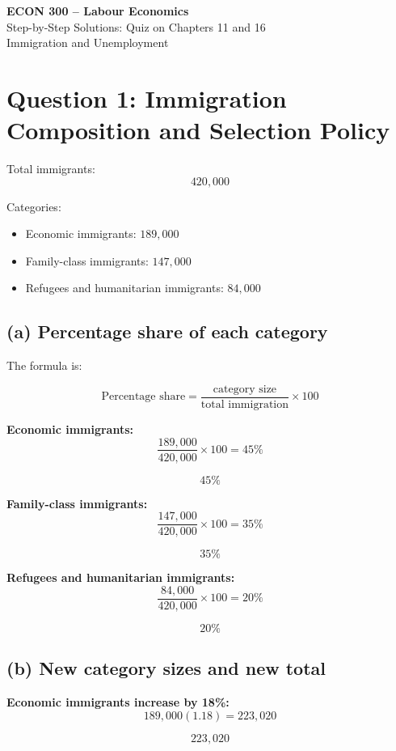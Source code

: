 \documentclass[12pt]{article}
\begin{document}
\begin{center}
\Large \textbf{ECON 300 -- Labour Economics} \\[0.3em]
\large Step-by-Step Solutions: Quiz on Chapters 11 and 16 \\[0.3em]
\large Immigration and Unemployment
\end{center}

\section*{Question 1: Immigration Composition and Selection Policy}

Total immigrants:
\[
420{,}000
\]

Categories:
\begin{itemize}
    \item Economic immigrants: \(189{,}000\)
    \item Family-class immigrants: \(147{,}000\)
    \item Refugees and humanitarian immigrants: \(84{,}000\)
\end{itemize}

\subsection*{(a) Percentage share of each category}

The formula is:

\[
\text{Percentage share}=\frac{\text{category size}}{\text{total immigration}}\times 100
\]

\textbf{Economic immigrants:}
\[
\frac{189{,}000}{420{,}000}\times 100 = 45\%
\]

\[
\boxed{45\%}
\]

\textbf{Family-class immigrants:}
\[
\frac{147{,}000}{420{,}000}\times 100 = 35\%
\]

\[
\boxed{35\%}
\]

\textbf{Refugees and humanitarian immigrants:}
\[
\frac{84{,}000}{420{,}000}\times 100 = 20\%
\]

\[
\boxed{20\%}
\]

\subsection*{(b) New category sizes and new total}

\textbf{Economic immigrants increase by 18\%:}
\[
189{,}000(1.18)=223{,}020
\]

\[
\boxed{223{,}020}
\]
\end{document}
